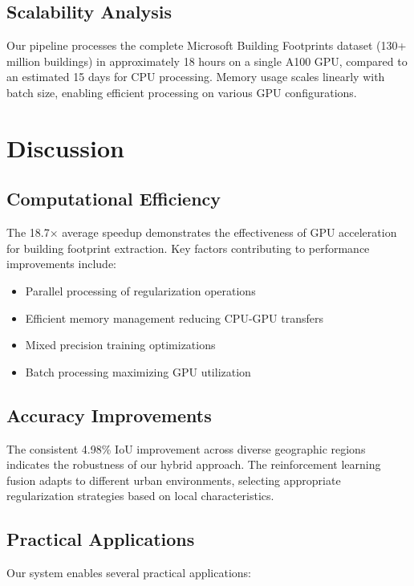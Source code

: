 \documentclass{article}
\begin{document}
\subsection{Scalability Analysis}

Our pipeline processes the complete Microsoft Building Footprints dataset (130+ million buildings) in approximately 18 hours on a single A100 GPU, compared to an estimated 15 days for CPU processing. Memory usage scales linearly with batch size, enabling efficient processing on various GPU configurations.

\section{Discussion}

\subsection{Computational Efficiency}

The 18.7× average speedup demonstrates the effectiveness of GPU acceleration for building footprint extraction. Key factors contributing to performance improvements include:

\begin{itemize}
\item Parallel processing of regularization operations
\item Efficient memory management reducing CPU-GPU transfers
\item Mixed precision training optimizations
\item Batch processing maximizing GPU utilization
\end{itemize}

\subsection{Accuracy Improvements}

The consistent 4.98\% IoU improvement across diverse geographic regions indicates the robustness of our hybrid approach. The reinforcement learning fusion adapts to different urban environments, selecting appropriate regularization strategies based on local characteristics.

\subsection{Practical Applications}

Our system enables several practical applications:
\end{document}
